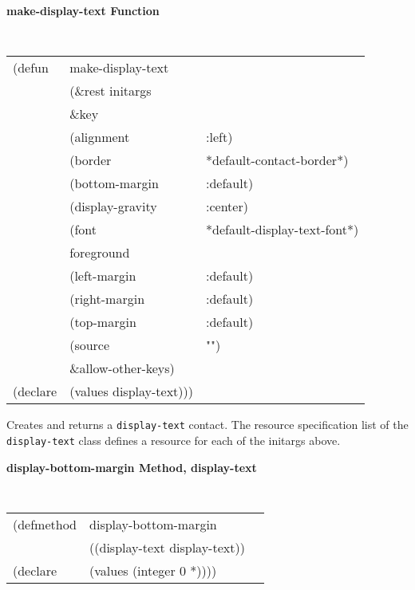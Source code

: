 {\samepage
{\large {\bf make-display-text \hfill Function}} 
\begin{flushright} \parbox[t]{6.125in}{
\tt
\begin{tabular}{lll}
\raggedright
(defun & make-display-text \\
       & (\&rest initargs \\
       & \&key  \\
       &   (alignment           & :left)\\
       &   (border              & *default-contact-border*) \\ 
       &   (bottom-margin       & :default) \\ 
       &   (display-gravity             & :center) \\
       &   (font                & *default-display-text-font*) \\ 
       &   foreground \\
       &   (left-margin         & :default) \\ 
       &   (right-margin        & :default) \\ 
       &   (top-margin          & :default) \\
       &   (source              & "")\\ 
       &   \&allow-other-keys) \\
(declare & (values   display-text)))
\end{tabular}
\rm

}\end{flushright}}

\begin{flushright} \parbox[t]{6.125in}{
Creates and returns a {\tt display-text} contact.
The resource specification list of the {\tt display-text} class defines
a resource for each of the initargs above.
}\end{flushright}




{\samepage
{\large {\bf display-bottom-margin \hfill Method, display-text}}
\begin{flushright} \parbox[t]{6.125in}{
\tt
\begin{tabular}{lll}
\raggedright
(defmethod & display-bottom-margin & \\
& ((display-text  display-text)) \\
(declare & (values (integer 0 *))))
\end{tabular}
\rm}\end{flushright}}

